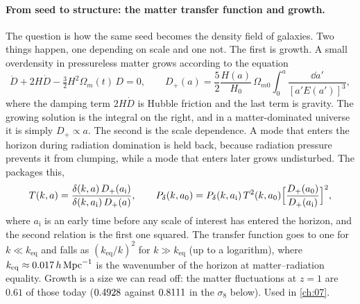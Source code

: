 \paragraph{From seed to structure: the matter transfer function and growth.}
The question is how the same seed becomes the density field of galaxies. Two things happen, one depending on scale and one not. The first is growth. A small overdensity in pressureless matter grows according to the equation
\begin{equation*}
\ddot D+2H\dot D-\tfrac32H^2\Omega_m(t)\,D=0,
\qquad
D_+(a)=\frac52\frac{H(a)}{H_0}\,\Omega_{m0}\int_0^a\frac{\dd a'}{[a'E(a')]^3},
\end{equation*}
where the damping term $2H\dot D$ is Hubble friction and the last term is gravity. The growing solution is the integral on the right, and in a matter-dominated universe it is simply $D_+\propto a$. The second is the scale dependence. A mode that enters the horizon during radiation domination is held back, because radiation pressure prevents it from clumping, while a mode that enters later grows undisturbed. The  packages this,
\begin{equation*}
T(k,a)=\frac{\delta(k,a)\,D_+(a_{\mathrm i})}{\delta(k,a_{\mathrm i})\,D_+(a)},
\qquad
P_\delta(k,a_0)=P_\delta(k,a_{\mathrm i})\,T^2(k,a_0)\Bigl[\frac{D_+(a_0)}{D_+(a_{\mathrm i})}\Bigr]^2,
\end{equation*}
where $a_{\mathrm i}$ is an early time before any scale of interest has entered the horizon, and the second relation is the first one squared. The transfer function goes to one for $k\ll k_{\mathrm{eq}}$ and falls as $(k_{\mathrm{eq}}/k)^2$ for $k\gg k_{\mathrm{eq}}$ (up to a logarithm), where $k_{\mathrm{eq}}\approx0.017\,h\,\mathrm{Mpc}^{-1}$ is the wavenumber of the horizon at matter--radiation equality. Growth is a size we can read off: the matter fluctuations at $z=1$ are $0.61$ of those today ($0.4928$ against $0.8111$ in the $\sigma_8$ below). Used in \cref{ch:07}.

